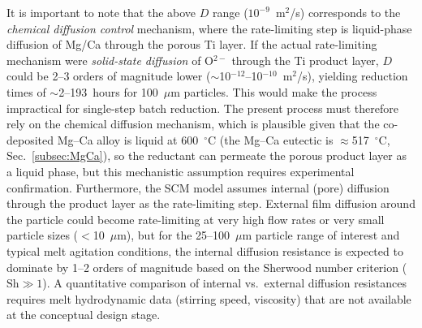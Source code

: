 \documentclass[sn-mathphys,Numbered]{sn-jnl}
\begin{document}
It is important to note that the above $D$ range ($10^{-9}$~m$^2$/s) corresponds to the \emph{chemical diffusion control} mechanism, where the rate-limiting step is liquid-phase diffusion of Mg/Ca through the porous Ti layer. If the actual rate-limiting mechanism were \emph{solid-state diffusion} of O$^{2-}$ through the Ti product layer, $D$ could be 2--3 orders of magnitude lower ($\sim$10$^{-12}$--10$^{-10}$~m$^2$/s), yielding reduction times of $\sim$2--193~hours for 100~$\mu$m particles. This would make the process impractical for single-step batch reduction. The present process must therefore rely on the chemical diffusion mechanism, which is plausible given that the co-deposited Mg--Ca alloy is liquid at 600~$^{\circ}$C (the Mg--Ca eutectic is $\approx$517~$^{\circ}$C, Sec.~\ref{subsec:MgCa}), so the reductant can permeate the porous product layer as a liquid phase, but this mechanistic assumption requires experimental confirmation. Furthermore, the SCM model assumes internal (pore) diffusion through the product layer as the rate-limiting step. External film diffusion around the particle could become rate-limiting at very high flow rates or very small particle sizes ($<$10~$\mu$m), but for the 25--100~$\mu$m particle range of interest and typical melt agitation conditions, the internal diffusion resistance is expected to dominate by 1--2 orders of magnitude based on the Sherwood number criterion ($\mathrm{Sh} \gg 1$). A quantitative comparison of internal vs.\ external diffusion resistances requires melt hydrodynamic data (stirring speed, viscosity) that are not available at the conceptual design stage.
\end{document}
